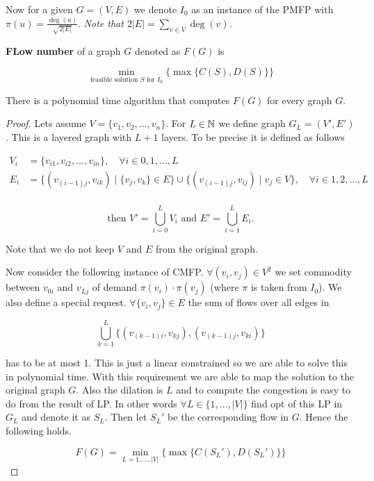 Now for a given $G = (V,E)$ we denote $I_{0}$ as an instance of the PMFP with $\pi(u) = \frac{\deg(u)}{\sqrt{2|E|}}$. \textit{Note that $2|E| = \sum_{v \in V} \deg(v)$.}

\begin{defn}
	\textbf{FLow number} of a graph $G$ denoted as $F(G)$ is
	
	$$
	\min_{\text{feasible solution } S \text{ for } I_{0}} \{ \max \{ C(S), D(S) \} \}
	$$
\end{defn}

\begin{claim}
	There is a polynomial time algorithm that computes $F(G)$ for every graph $G$.
\end{claim}

\begin{proof}
	Lets assume $V = \{v_{1}, v_{2}, \dots, v_{n}\}$. For $L \in \mathbb{N}$ we define graph $G_{L} = (V', E')$. This is a layered graph with $L+1$ layers. To be precise it is defined as follows
	
	$$
	\begin{aligned}
		V_{i} &= \{v_{i1}, v_{i2}, \dots, v_{in}\}, \quad \forall i \in 0, 1, \dots, L \\
		E_{i} &= \{(v_{(i-1)j}, v_{ik}) \mid \{v_{j}, v_{k}\} \in E \} \cup \{(v_{(i-1)j}, v_{ij}) \mid v_{j} \in V\}, \quad \forall i \in 1,2, \dots, L \\
	\end{aligned}
	$$
	
	$$
	\text{then } V' = \bigcup_{i = 0}^{L} V_{i} \text{ and } E' = \bigcup_{i=1}^{L} E_{i}.
	$$
	
	Note that we do not keep $V$ and $E$ from the original graph.
	
	Now consider the following instance of CMFP. $\forall (v_{i}, v_{j}) \in V^2$ we set commodity between $v_{0i}$ and $v_{Lj}$ of demand $\pi(v_{i}) \cdot \pi(v_{j})$ (where $\pi$ is taken from $I_{0}$). We also define a special request. $\forall \{v_{i}, v_{j}\} \in E$ the sum of flows over all edges in
	
	$$
	\bigcup_{k = 1}^{L} \{ (v_{(k-1)i}, v_{kj}), (v_{(k-1)j}, v_{ki}) \}
	$$
	
	has to be at most 1. This is just a linear constrained so we are able to solve this in polynomial time. With this requirement we are able to map the solution to the original graph $G$. Also the dilation is $L$ and to compute the congestion is easy to do from the result of LP. In other words $\forall L \in \{1, \dots, |V|\}$ find opt of this LP in $G_{L}$ and denote it as $S_{L}$. Then let $S_{L}'$ be the corresponding flow in $G$. Hence the following holds.
	
	$$
	F(G) = \min_{L = 1, \dots, |V|} \{ \max \{ C(S_{L}'), D(S_{L}')\} \}
	$$
\end{proof}

